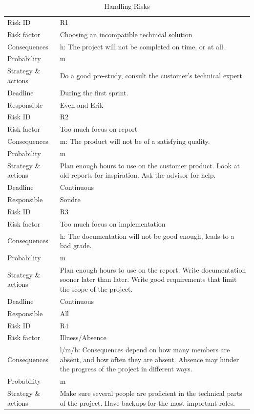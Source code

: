 \begin{longtable}{>{\footnotesize}p{} >{\footnotesize}p{}}
	\caption{Handling Risks}
	\endhead
	\toprule
	Risk ID & R1 \\
	Risk factor & Choosing an incompatible technical solution \\
	Consequences & \Gls{h}: The project will not be completed on time, or at all. \\
	Probability & \Gls{m} \\ 
	Strategy \& actions & Do a good pre-study, consult the customer’s technical expert. \\
	Deadline & During the first sprint.\\
	Responsible & Even and Erik \\
	\midrule
	Risk ID & R2 \\
	Risk factor & Too much focus on report \\
	Consequences & \Gls{m}: The product will not be of a satisfying quality. \\
	Probability & \Gls{m} \\ 
	Strategy \& actions & Plan enough hours to use on the customer product. Look at old reports for inspiration. Ask the advisor for help. \\
	Deadline & Continuous\\
	Responsible & Sondre \\
	\midrule
	Risk ID & R3 \\
	Risk factor & Too much focus on implementation \\
	Consequences & \Gls{h}: The documentation will not be good enough, leads to a bad grade. \\
	Probability & \Gls{m} \\ 
	Strategy \& actions & Plan enough hours to use on the report. Write documentation sooner later than later. Write good requirements that limit the scope of the project. \\
	Deadline & Continuous \\
	Responsible & All \\
	\midrule
	Risk ID & R4 \\
	Risk factor & Illness/Absence \\
	Consequences & \Gls{l}/\Gls{m}/\Gls{h}: Consequences depend on how many members are absent, and how often they are absent. Absence may hinder the progress of the project in different ways.  \\
	Probability & \Gls{m} \\ 
	Strategy \& actions & Make sure several people are proficient in the technical parts of the project. Have backups for the most important roles. \\

\end{longtable}
